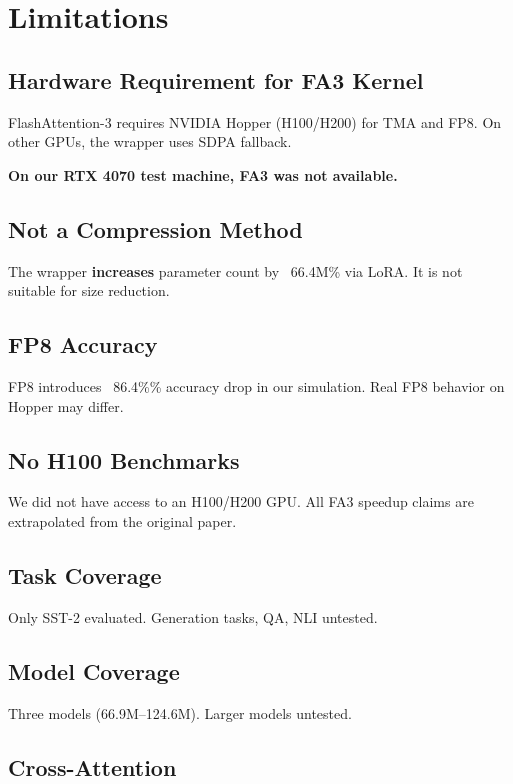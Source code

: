 \section{Limitations}

\subsection{Hardware Requirement for FA3 Kernel}

FlashAttention-3 requires NVIDIA Hopper (H100/H200) for TMA and FP8. 
On other GPUs, the wrapper uses SDPA fallback.

\textbf{On our RTX 4070 test machine, FA3 was not available.}

\subsection{Not a Compression Method}

The wrapper \textbf{increases} parameter count by ~66.4M\% via LoRA. 
It is not suitable for size reduction.

\subsection{FP8 Accuracy}

FP8 introduces ~86.4\%\% accuracy drop in our simulation. Real 
FP8 behavior on Hopper may differ.

\subsection{No H100 Benchmarks}

We did not have access to an H100/H200 GPU. All FA3 speedup claims are 
extrapolated from the original paper.

\subsection{Task Coverage}

Only SST-2 evaluated. Generation tasks, QA, NLI untested.

\subsection{Model Coverage}

Three models (66.9M--124.6M). Larger models untested.

\subsection{Cross-Attention}

